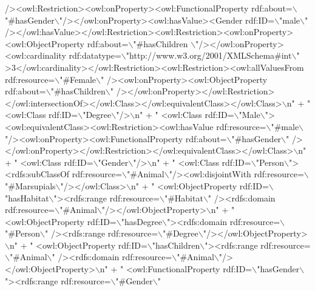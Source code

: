\begin{DoxyCode}
{      /><owl:Restriction><owl:onProperty><owl:FunctionalProperty rdf:about=\(\backslash\)"#hasGender\(\backslash\)"/></owl:onProperty><owl:hasValue><Gender rdf:ID=\(\backslash\)"male\(\backslash\)"
      /></owl:hasValue></owl:Restriction><owl:Restriction><owl:onProperty><owl:ObjectProperty rdf:about=\(\backslash\)"#hasChildren
      \(\backslash\)"/></owl:onProperty><owl:cardinality rdf:datatype=\(\backslash\)"http://www.w3.org/2001/XMLSchema#int\(\backslash\)"
      >3</owl:cardinality></owl:Restriction><owl:Restriction><owl:allValuesFrom rdf:resource=\(\backslash\)"#Female\(\backslash\)"
      /><owl:onProperty><owl:ObjectProperty rdf:about=\(\backslash\)"#hasChildren\(\backslash\)"
      /></owl:onProperty></owl:Restriction></owl:intersectionOf></owl:Class></owl:equivalentClass></owl:Class>\(\backslash\)n"}
            + \textcolor{stringliteral}{"  <owl:Class rdf:ID=\(\backslash\)"Degree\(\backslash\)"/>\(\backslash\)n"}
            + \textcolor{stringliteral}{"  <owl:Class rdf:ID=\(\backslash\)"Male\(\backslash\)"><owl:equivalentClass><owl:Restriction><owl:hasValue
       rdf:resource=\(\backslash\)"#male\(\backslash\)"/><owl:onProperty><owl:FunctionalProperty rdf:about=\(\backslash\)"#hasGender\(\backslash\)"
      /></owl:onProperty></owl:Restriction></owl:equivalentClass></owl:Class>\(\backslash\)n"}
            + \textcolor{stringliteral}{"  <owl:Class rdf:ID=\(\backslash\)"Gender\(\backslash\)"/>\(\backslash\)n"}
            + \textcolor{stringliteral}{"  <owl:Class rdf:ID=\(\backslash\)"Person\(\backslash\)"><rdfs:subClassOf rdf:resource=\(\backslash\)"#Animal\(\backslash\)"/><owl:disjointWith
       rdf:resource=\(\backslash\)"#Marsupials\(\backslash\)"/></owl:Class>\(\backslash\)n"}
            + \textcolor{stringliteral}{"  <owl:ObjectProperty rdf:ID=\(\backslash\)"hasHabitat\(\backslash\)"><rdfs:range rdf:resource=\(\backslash\)"#Habitat\(\backslash\)"
      /><rdfs:domain rdf:resource=\(\backslash\)"#Animal\(\backslash\)"/></owl:ObjectProperty>\(\backslash\)n"}
            + \textcolor{stringliteral}{"  <owl:ObjectProperty rdf:ID=\(\backslash\)"hasDegree\(\backslash\)"><rdfs:domain rdf:resource=\(\backslash\)"#Person\(\backslash\)"
      /><rdfs:range rdf:resource=\(\backslash\)"#Degree\(\backslash\)"/></owl:ObjectProperty>\(\backslash\)n"}
            + \textcolor{stringliteral}{"  <owl:ObjectProperty rdf:ID=\(\backslash\)"hasChildren\(\backslash\)"><rdfs:range rdf:resource=\(\backslash\)"#Animal\(\backslash\)"
      /><rdfs:domain rdf:resource=\(\backslash\)"#Animal\(\backslash\)"/></owl:ObjectProperty>\(\backslash\)n"}
            + \textcolor{stringliteral}{"  <owl:FunctionalProperty rdf:ID=\(\backslash\)"hasGender\(\backslash\)"><rdfs:range rdf:resource=\(\backslash\)"#Gender\(\backslash\)"
}
\end{DoxyCode}
